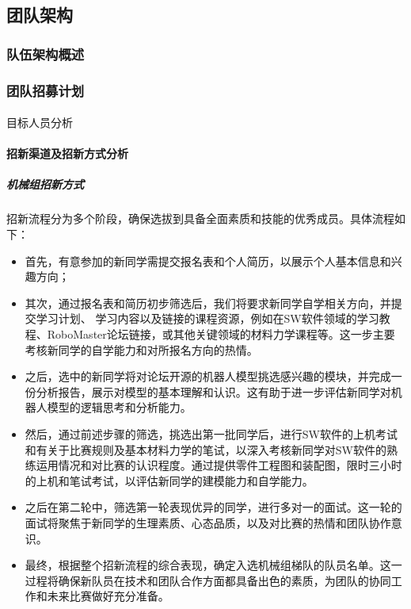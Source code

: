 \subsection{团队架构}

    \subsubsection{队伍架构概述}
    
        \noindent

        \noindent

    \subsubsection{团队招募计划}

        \paragraph{}{目标人员分析}

        \paragraph{招新渠道及招新方式分析}

            \subparagraph{机械组招新方式}

                招新流程分为多个阶段，确保选拔到具备全面素质和技能的优秀成员。具体流程如下：


                \begin{itemize}
                    \item 首先，有意参加的新同学需提交报名表和个人简历，以展示个人基本信息和兴趣方向；
                    \item 其次，通过报名表和简历初步筛选后，我们将要求新同学自学相关方向，并提交学习计划、 学习内容以及链接的课程资源，例如在SW软件领域的学习教程、RoboMaster论坛链接，或其他关键领域的材料力学课程等。这一步主要考核新同学的自学能力和对所报名方向的热情。
                    \item 之后，选中的新同学将对论坛开源的机器人模型挑选感兴趣的模块，并完成一份分析报告，展示对模型的基本理解和认识。这有助于进一步评估新同学对机器人模型的逻辑思考和分析能力。
                    \item 然后，通过前述步骤的筛选，挑选出第一批同学后，进行SW软件的上机考试和有关于比赛规则及基本材料力学的笔试，以深入考核新同学对SW软件的熟练运用情况和对比赛的认识程度。通过提供零件工程图和装配图，限时三小时的上机和笔试考试，以评估新同学的建模能力和自学能力。 
                    \item 之后在第二轮中，筛选第一轮表现优异的同学，进行多对一的面试。这一轮的面试将聚焦于新同学的生理素质、心态品质，以及对比赛的热情和团队协作意识。 
                    \item 最终，根据整个招新流程的综合表现，确定入选机械组梯队的队员名单。这一过程将确保新队员在技术和团队合作方面都具备出色的素质，为团队的协同工作和未来比赛做好充分准备。
                \end{itemize}

